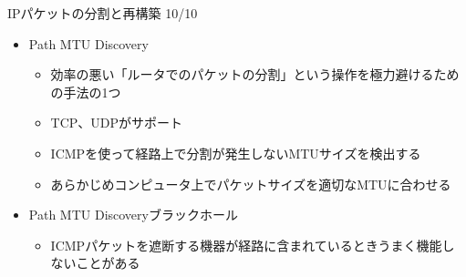 \documentclass[12pt,aspectratio=169]{beamer}
\begin{document}
\begin{frame}{IPパケットの分割と再構築 10/10}

  \begin{itemize}
    \item Path MTU Discovery
      \begin{itemize}
        \item 効率の悪い「ルータでのパケットの分割」という操作を極力避けるための手法の1つ
        \item TCP、UDPがサポート
        \item ICMPを使って経路上で分割が発生しないMTUサイズを検出する
        \item あらかじめコンピュータ上でパケットサイズを適切なMTUに合わせる
      \end{itemize}
    \item Path MTU Discoveryブラックホール
      \begin{itemize}
        \item ICMPパケットを遮断する機器が経路に含まれているときうまく機能しないことがある
      \end{itemize}
  \end{itemize}

\end{frame}
\end{document}

